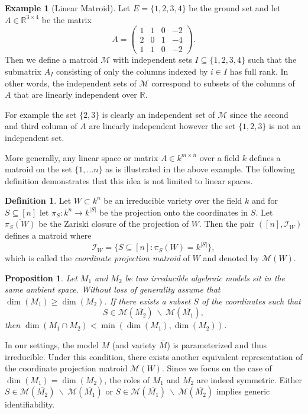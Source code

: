 \documentclass[12pt,reqno]{amsart}
\theoremstyle{plain}
\newtheorem{proposition}[theorem]{Proposition}
\theoremstyle{definition}
\newtheorem{definition}[theorem]{Definition}
\newtheorem{example}[theorem]{Example}
\newcommand{\RR}{\mathbb{R}}
\newcommand{\cm}{\mathcal{M}}
\begin{document}
\begin{example}[Linear Matroid]
Let $E = \{1, 2, 3, 4\}$ be the ground set and let $A \in \RR^{3 \times 4}$ be the matrix
\[
A =
\begin{pmatrix}
1 & 1 & 0 & -2 \\
2 & 0 & 1 & -4 \\
1 & 1 & 0 & -2
\end{pmatrix}.
\]
Then we define a matroid $\mathcal{M}$ with independent sets $I \subseteq \{1,2,3,4\}$ such that the submatrix $A_I$ consisting of only the columns indexed  by $i \in I$ has full rank. In other words, the independent sets of $\mathcal{M}$ correspond to subsets of the columns of $A$ that are linearly independent over $\RR$.

For example the set $\{2, 3\}$ is clearly an independent set of $\cm$ since the second and third column of $A$ are linearly independent however the set $\{1,2,3\}$ is not an independent set. 
\end{example}

More generally, any linear space or matrix $A \in k^{m \times n}$ over a field $k$ defines a matroid on the set $\{1, \ldots n \}$ as is illustrated in the above example. The following definition demonstrates that this idea is not limited to linear spaces. 

\begin{definition}
Let $W\subset k^n$ be an irreducible variety over the field $k$ and for $S\subseteq [n]$ let $\pi_S:k^n\rightarrow k^{|S|}$ be the projection onto the coordinates in $S$. Let $\overline{\pi_S(W)}$ be the Zariski closure of the projection of $W$. Then the pair $([n], \mathcal{I}_W)$ defines a matroid where
$$
\mathcal{I}_W=\{S\subseteq[n]:\overline{\pi_S(W)}=k^{|S|}\},
$$
which is called the \emph{coordinate projection matroid} of $W$ and denoted by $\mathcal{M}(W)$.
\end{definition}

\begin{proposition}\label{coorid}
\cite[Proposition 3.1]{Seth19M}
Let $M_1$ and $M_2$ be two irreducible algebraic models sit in the same ambient space. Without loss of generality assume that $\dim(M_1)\geq\dim(M_2)$. If there exists a subset $S$ of the coordinates such that
$$
S\in \mathcal{M}(\overline{M_2})\ \backslash\ \mathcal{M}(\overline{M_1}),
$$
then $\dim(M_1\cap M_2)<\min(\dim(M_1),\dim(M_2))$.
\end{proposition}


In our settings, the model $M$ (and variety $\overline{M}$) is parameterized and thus irreducible. Under this condition, there exists another equivalent representation of the coordinate projection matroid $\mathcal{M}(W)$. Since we focus on the case of $\dim(M_1)=\dim(M_2)$, the roles of $M_1$ and $M_2$ are indeed symmetric. Either $S\in \mathcal{M}(\overline{M_2})\ \backslash\ \mathcal{M}(\overline{M_1})$ or $S\in \mathcal{M}(\overline{M_1})\ \backslash\ \mathcal{M}(\overline{M_2})$ implies generic identifiability.
\end{document}
